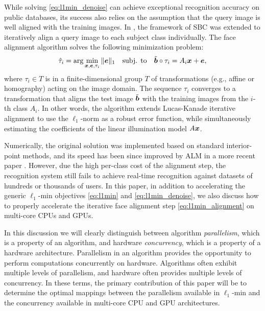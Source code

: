 \documentclass[10pt,twocolumn,letterpaper]{article}
\begin{document}
While solving \eqref{eq:l1min_denoise} can achieve exceptional
recognition accuracy on public databases, its success also relies on the assumption
that the query image is well aligned with the training images. In
\cite{WagnerA2009-CVPR}, the framework of SBC was extended to iteratively align
a query image to each subject class individually. The face alignment algorithm solves
the following minimization problem:
\begin{equation}
\hat{\tau}_i = \arg\min_{{\boldsymbol{x}}, {\boldsymbol{e}}, \tau_i} \|{\boldsymbol{e}}\|_1\quad \mbox{subj. to}\quad \tilde{{\boldsymbol{b}}}\circ\tau_i = A_i{\boldsymbol{x}} + {\boldsymbol{e}},
\label{eq:l1min_alignment}
\end{equation}
where $\tau_i\in T$ is in a finite-dimensional group $T$ of transformations
(e.g., affine or homography) acting on the image domain.  The sequence
$\tau_i$ converges to a transformation that aligns the test image $\tilde{{\boldsymbol{b}}}$
with the training images from the $i$-th class $A_i$. In other words, the algorithm 
extends Lucas-Kanade iterative alignment \cite{LucasB1981} to use the
$\ell_1$-norm as a robust error function, while simultaneously estimating
the coefficients of the linear illumination model $A{\boldsymbol{x}}$.  

Numerically, the original solution \cite{WagnerA2009-CVPR} was implemented based 
on standard interior-point methods, and its speed has been since improved by ALM in a more recent paper
\cite{WagnerA2011-PAMI}. However, due the high per-class cost
of the alignment step, the recognition system still fails to achieve real-time recognition against datasets of hundreds or thousands of users.
In this paper, in addition to accelerating the generic
$\ell_1$-min objectives \eqref{eq:l1min} and \eqref{eq:l1min_denoise}, we 
also discuss how to properly accelerate the iterative face alignment step
\eqref{eq:l1min_alignment} on multi-core CPUs and GPUs.

In this discussion we will clearly distinguish between algorithm {\em parallelism},
which is a property of an algorithm, and hardware {\em concurrency}, which is a
property of a hardware architecture. Parallelism in an algorithm provides the
opportunity to perform computations concurrently on hardware.  Algorithms often
exhibit multiple levels of parallelism, and hardware often provides multiple
levels of concurrency.  In these terms, the primary contribution of this paper
will be to determine the optimal mappings between the parallelism available in
$\ell_1$-min and the concurrency available in multi-core CPU and GPU
architectures.
\end{document}
